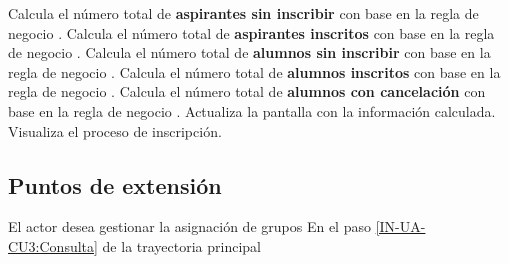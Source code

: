 \begin{UCtrayectoria}
	\UCpaso Calcula el número total de \textbf{aspirantes sin inscribir} con base en la regla de negocio .		
	\UCpaso Calcula el número total de \textbf{aspirantes inscritos} con base en la regla de negocio .		
	\UCpaso Calcula el número total de \textbf{alumnos sin inscribir} con base en la regla de negocio .		
	\UCpaso Calcula el número total de \textbf{alumnos inscritos} con base en la regla de negocio .
	\UCpaso Calcula el número total de \textbf{alumnos con cancelación} con base en la regla de negocio .
	\UCpaso Actualiza la pantalla  con la información calculada.
	\UCpaso[\UCactor] \label{IN-UA-CU3:Consulta} Visualiza el proceso de inscripción.
\end{UCtrayectoria}

\subsection{Puntos de extensión}

{El actor desea gestionar la asignación de grupos}
{En el paso \ref{IN-UA-CU3:Consulta} de la trayectoria principal}
{}
